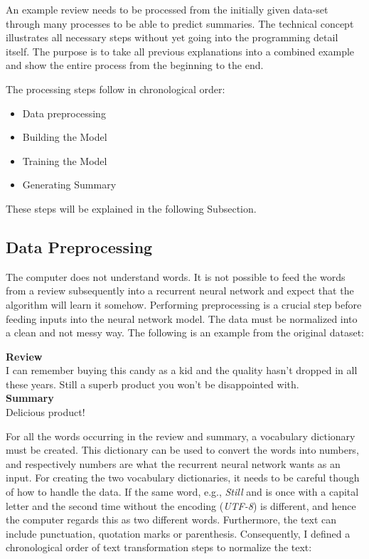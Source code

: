 An example review needs to be processed from the initially given data-set through many processes to be able to predict summaries. The technical concept illustrates all necessary steps without yet going into the programming detail itself. The purpose is to take all previous explanations into a combined example and show the entire process from the beginning to the end. 

The processing steps follow in chronological order:

\begin{itemize}
	\item Data preprocessing
	\item Building the Model
	\item Training the Model
	\item Generating Summary
\end{itemize}

These steps will be explained in the following Subsection.

\subsection{Data Preprocessing}\label{ss:preprop}

The computer does not understand words. It is not possible to feed the words from a review subsequently into a recurrent neural network and expect that the algorithm will learn it somehow. Performing preprocessing is a crucial step before feeding inputs into the neural network model. The data must be normalized into a clean and not messy way. The following is an example from the original dataset:

\begin{tcolorbox}
	\textbf{Review} \\
	I can remember buying this candy as a kid and the quality hasn't dropped in all these years. Still a superb product you won't be disappointed with. \\
	
	\textbf{Summary} \\
	Delicious product!
\end{tcolorbox}

For all the words occurring in the review and summary, a vocabulary dictionary must be created. This dictionary can be used to convert the words into numbers, and respectively numbers are what the recurrent neural network wants as an input. For creating the two vocabulary dictionaries, it needs to be careful though of how to handle the data. If the same word, e.g., \textit{Still} and  is once with a capital letter and the second time without the encoding (\textit{UTF-8}) is different, and hence the computer regards this as two different words. Furthermore, the text can include punctuation, quotation marks or parenthesis. Consequently, I defined a chronological order of text transformation steps to normalize the text:

